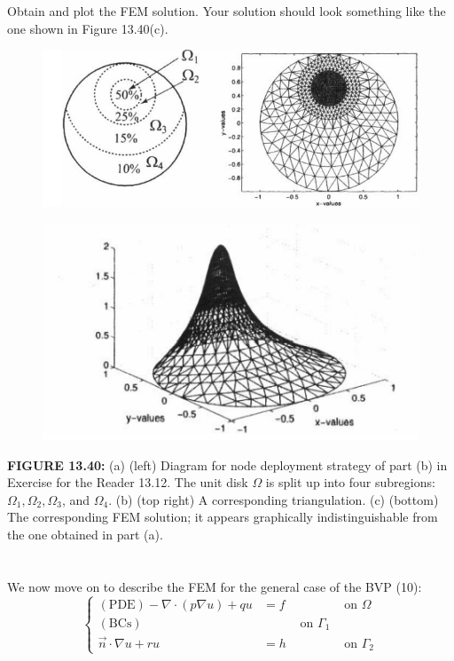\documentclass[../main.tex]{subfiles}
\begin{document}
Obtain and plot the FEM solution. Your solution should look something like the 
one shown in Figure 13.40(c). 
\begin{figure}[H]
\includegraphics[width=0.9\linewidth]{26}
	\centering
	\label{pfig:ch13_26}
\end{figure}
	\begin{figure}[H]
\includegraphics[width=0.9\linewidth]{27}
	\centering
	\label{pfig:ch13_27}
\end{figure}
\textbf{FIGURE 13.40:} (a) (left) Diagram for node deployment strategy of part (b) in Exercise for the Reader 13.12. The unit disk $\Omega$ is split up into four subregions: $\Omega_{1}, \Omega_{2}, \Omega_{3}$, and $\Omega_{4}$.
(b) (top right) A corresponding triangulation.
(c) (bottom) The corresponding FEM solution; it appears graphically indistinguishable from the one obtained in part (a).
\\
\\
\\
We now move on to describe the FEM for the general case of the BVP (10):
$$
\left\{\begin{aligned}
(\mathrm{PDE})-\nabla \cdot(p \nabla u)+q u &=f & & \text { on } \Omega \\
(\mathrm{BCs}) & & \text { on } \Gamma_{1} \\
\vec{n} \cdot \nabla u+r u &=h & & \text { on } \Gamma_{2}
\end{aligned}\right.
$$
\end{document}
